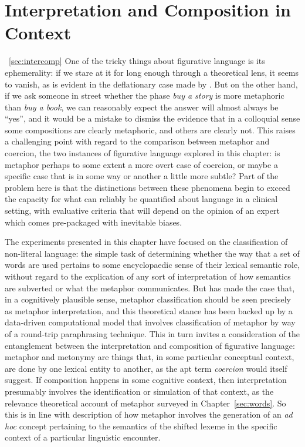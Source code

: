 \section{Interpretation and Composition in Context} ~\ref{sec:intercomp}
One of the tricky things about figurative language is its ephemerality: if we stare at it for long enough through a theoretical lens, it seems to vanish, as is evident in the deflationary case made by \cite{SperberEA2012}.  But on the other hand, if we ask someone in street whether the phase \emph{buy a story} is more metaphoric than \emph{buy a book}, we can reasonably expect the answer will almost always be ``yes'', and it would be a mistake to dismiss the evidence that in a colloquial sense some compositions are clearly metaphoric, and others are clearly not.  This raises a challenging point with regard to the comparison between metaphor and coercion, the two instances of figurative language explored in this chapter: is metaphor perhaps to some extent a more overt case of coercion, or maybe a specific case that is in some way or another a little more subtle?  Part of the problem here is that the distinctions between these phenomena begin to exceed the capacity for what can reliably be quantified about language in a clinical setting, with evaluative criteria that will depend on the opinion of an expert which comes pre-packaged with inevitable biases.

The experiments presented in this chapter have focused on the classification of non-literal language: the simple task of determining whether the way that a set of words are used pertains to some encyclopaedic sense of their lexical semantic role, without regard to the explication of any sort of interpretation of how semantics are subverted or what the metaphor communicates.  But \cite{Shutova2010} has made the case that, in a cognitively plausible sense, metaphor classification should be seen precisely as metaphor interpretation, and this theoretical stance has been backed up by a data-driven computational model that involves classification of metaphor by way of a round-trip paraphrasing technique.  This in turn invites a consideration of the entanglement between the interpretation and composition of figurative language: metaphor and metonymy are things that, in some particular conceptual context, are done by one lexical entity to another, as the apt term \emph{coercion} would itself suggest.  If composition happens in some cognitive context, then interpretation presumably involves the identification or simulation of that context, as the relevance theoretical account of metaphor surveyed in Chapter~\ref{sec:words}.  So this is in line with  description of how metaphor involves the generation of an \emph{ad hoc} concept pertaining to the semantics of the shifted lexeme in the specific context of a particular linguistic encounter.

